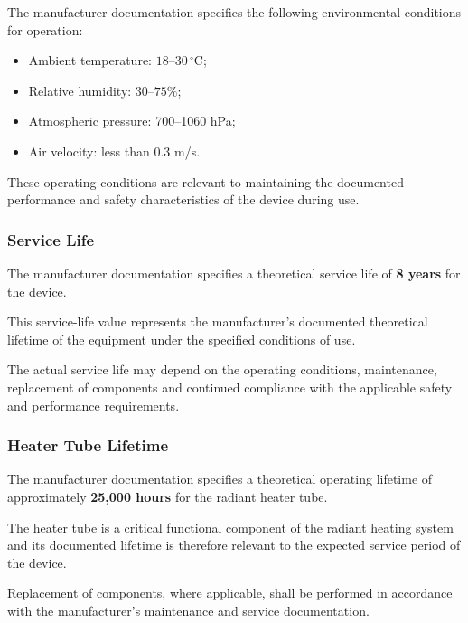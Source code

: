 The manufacturer documentation specifies the following environmental
conditions for operation:

\begin{itemize}

    \item Ambient temperature: $18$--$30\,^\circ$C;

    \item Relative humidity: $30$--$75\%$;

    \item Atmospheric pressure: 700--1060 hPa;

    \item Air velocity: less than 0.3 m/s.

\end{itemize}

These operating conditions are relevant to maintaining the documented
performance and safety characteristics of the device during use.

\subsubsection{Service Life}

The manufacturer documentation specifies a theoretical service life of
\textbf{8 years} for the device.

This service-life value represents the manufacturer's documented theoretical
lifetime of the equipment under the specified conditions of use.

The actual service life may depend on the operating conditions, maintenance,
replacement of components and continued compliance with the applicable
safety and performance requirements.

\subsubsection{Heater Tube Lifetime}

The manufacturer documentation specifies a theoretical operating lifetime
of approximately \textbf{25,000 hours} for the radiant heater tube.

The heater tube is a critical functional component of the radiant heating
system and its documented lifetime is therefore relevant to the expected
service period of the device.

Replacement of components, where applicable, shall be performed in
accordance with the manufacturer's maintenance and service documentation.

